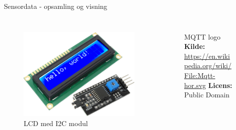 \documentclass[aspectratio=169]{beamer}
\begin{document}
\begin{frame}{Sensordata - opsamling og visning}
\begin{columns}
\begin{column}{0.4\textwidth}
\begin{columns}
\begin{column}{0.45\textwidth}
\begin{figure}[height=0.2\textheight]
				\end{figure}
			\end{column}
		\end{columns}
		\begin{columns}
		\begin{column}{0.45\textwidth}
				\begin{figure}[height=0.2\textheight]
  					\includegraphics[height=0.2\textheight,keepaspectratio=true]{assets/pictures/lcd-i2cmodule.png}
  					\caption{LCD med I2C modul}
  					\label{fig:lcd-i2cmodule}
				\end{figure}
			\end{column}
			\begin{column}{0.45\textwidth}
				\begin{figure}[height=0.2\textheight]
  					
  					\caption{MQTT logo
  					\captionline \textbf{Kilde:} \url{https://en.wikipedia.org/wiki/File:Mqtt-hor.svg}
  					\captionline \textbf{Licens:} Public Domain}
  					\label{fig:mqtt-logo}
				\end{figure}
			\end{column}
		\end{columns}
	\end{column}
\end{columns}
\end{frame}
\end{document}
